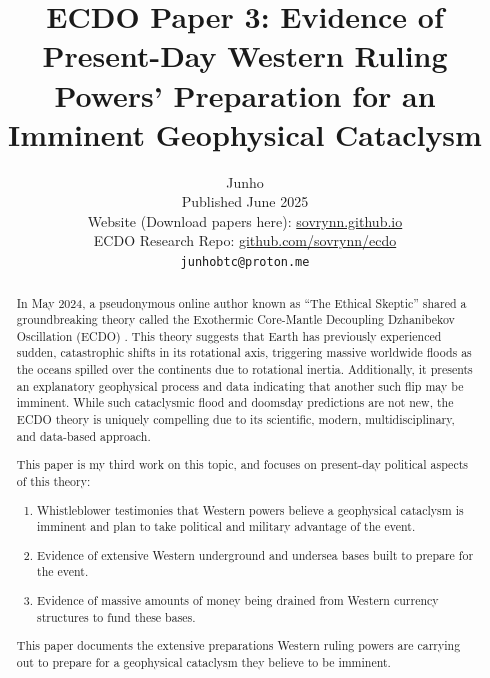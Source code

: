 \documentclass[10pt,twocolumn,letterpaper]{article}
\begin{document}
\title{ECDO Paper 3: Evidence of Present-Day Western Ruling Powers' Preparation for an Imminent Geophysical Cataclysm}

\author{Junho\\
Published June 2025\\
Website (Download papers here): \href{https://sovrynn.github.io}{sovrynn.github.io}\\
ECDO Research Repo: \href{https://github.com/sovrynn/ecdo}{github.com/sovrynn/ecdo}\\
{\tt\small junhobtc@proton.me}
}

\maketitle

\begin{abstract}
In May 2024, a pseudonymous online author known as “The Ethical Skeptic” \cite{0} shared a groundbreaking theory called the Exothermic Core-Mantle Decoupling Dzhanibekov Oscillation (ECDO) \cite{1}. This theory suggests that Earth has previously experienced sudden, catastrophic shifts in its rotational axis, triggering massive worldwide floods as the oceans spilled over the continents due to rotational inertia. Additionally, it presents an explanatory geophysical process and data indicating that another such flip may be imminent. While such cataclysmic flood and doomsday predictions are not new, the ECDO theory is uniquely compelling due to its scientific, modern, multidisciplinary, and data-based approach.

This paper is my third work \cite{2,3} on this topic, and focuses on present-day political aspects of this theory:
\begin{flushleft}
\begin{enumerate}
    \item Whistleblower testimonies that Western powers believe a geophysical cataclysm is imminent and plan to take political and military advantage of the event.
    \item Evidence of extensive Western underground and undersea bases built to prepare for the event.
    \item Evidence of massive amounts of money being drained from Western currency structures to fund these bases.
\end{enumerate}
\end{flushleft}

This paper documents the extensive preparations Western ruling powers are carrying out to prepare for a geophysical cataclysm they believe to be imminent.
\end{abstract}
\end{document}
